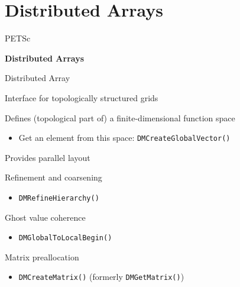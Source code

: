 




%
%
\section{Distributed Arrays}
\begin{frame}{PETSc}
   \begin{center} \Large \textbf{Distributed Arrays} \end{center}
\end{frame}

\begin{frame}[fragile]{Distributed Array}

  \begin{block}{Interface for topologically structured grids}
  \end{block}

  \begin{block}{Defines (topological part of) a finite-dimensional function space}
    \begin{itemize} 
      \item Get an element from this space: \lstinline|DMCreateGlobalVector()| 
    \end{itemize}
  \end{block}

  \begin{block}{Provides parallel layout}
  \end{block}

  \begin{block}{Refinement and coarsening}
    \begin{itemize}
      \item \lstinline|DMRefineHierarchy()| 
    \end{itemize}
  \end{block}

  \begin{block}{Ghost value coherence}
    \begin{itemize}
       \item \lstinline|DMGlobalToLocalBegin()|
     \end{itemize}
  \end{block}

  \begin{block}{Matrix preallocation}
       \begin{itemize}
         \item \lstinline|DMCreateMatrix()| (formerly \lstinline|DMGetMatrix()|) 
       \end{itemize}
  \end{block}
\end{frame}

